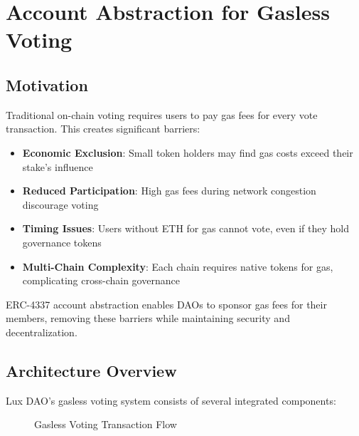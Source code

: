 \section{Account Abstraction for Gasless Voting}


\subsection{Motivation}

Traditional on-chain voting requires users to pay gas fees for every vote transaction. This creates significant barriers:

\begin{itemize}
    \item \textbf{Economic Exclusion}: Small token holders may find gas costs exceed their stake's influence
    \item \textbf{Reduced Participation}: High gas fees during network congestion discourage voting
    \item \textbf{Timing Issues}: Users without ETH for gas cannot vote, even if they hold governance tokens
    \item \textbf{Multi-Chain Complexity}: Each chain requires native tokens for gas, complicating cross-chain governance
\end{itemize}

ERC-4337 account abstraction enables DAOs to sponsor gas fees for their members, removing these barriers while maintaining security and decentralization.

\subsection{Architecture Overview}

Lux DAO's gasless voting system consists of several integrated components:

\begin{figure}[h]
\centering
{}
\caption{Gasless Voting Transaction Flow}
\end{figure}

